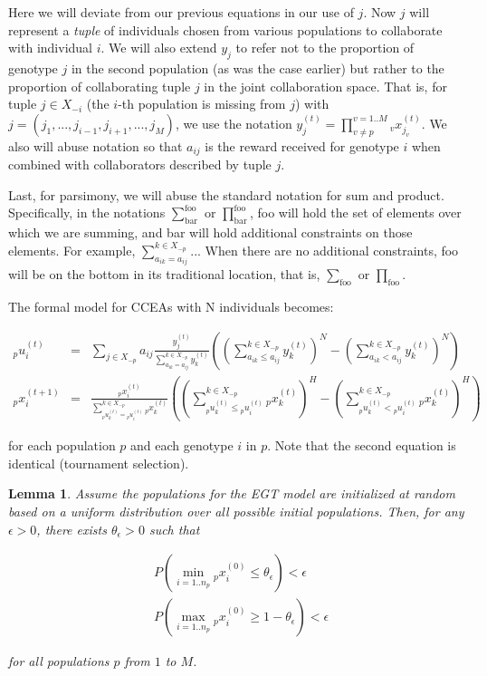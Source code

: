 \documentclass{acm_proc_article-sp}
\newtheorem{lemma}{Lemma}
\begin{document}
Here we will deviate from our previous equations in our use of \(j\).  Now \(j\) will represent a {\it tuple} of individuals chosen from various populations to collaborate with individual \(i\).  We will also extend \(y_j\) to refer not to the proportion of genotype \(j\) in the second population (as was the case earlier) but rather to the proportion of collaborating tuple \(j\) in the joint collaboration space.  That is, for tuple $j \in X_{-i}$ (the $i$-th population is missing from $j$) with $j = \left( j_1, ..., j_{i-1}, j_{i+1}, ..., j_M \right)$, we use the notation $y^{(t)}_j = \prod^{v=1..M}_{v \ne p} {_v}x^{(t)}_{j_v}$.  We also will abuse notation so that $a_{i j}$ is the reward received for genotype $i$ when combined with collaborators described by tuple $j$.

Last, for parsimony, we will abuse the standard notation for sum and product.  Specifically, in the notations \(\sum^{\mbox{foo}}_{\mbox{bar}}\) or \(\prod^{\mbox{foo}}_{\mbox{bar}}\),  foo will hold the set of elements over which we are summing, and bar will hold additional constraints on those elements.  For example, \(\sum^{k \in X_{-p}}_{a_{i k} = a_{i j}} ...\)  When there are no additional constraints, foo will be on the bottom in its traditional location, that is, \(\sum_{\mbox{foo}}\) or \(\prod_{\mbox{foo}}\).

The formal model for CCEAs with N individuals becomes:

\noindent\begin{eqnarray}
{_p}u^{(t)}_i & = & \sum_{j \in X_{-p}} { a_{i j} \frac{y^{(t)}_j}{\sum^{k \in X_{-p}}_{a_{i k} = a_{i j}} y^{(t)}_k} \left( \left( \sum^{k \in X_{-p}}_{a_{i k} \leq a_{i j} } y^{(t)}_k \right)^N - \left( \sum^{k \in X_{-p}}_{a_{i k} < a_{i j} } y^{(t)}_k \right)^N \right) } \label{approx_eqn1}\\
{_p}x^{(t+1)}_i   & = & \frac{{_p}x^{(t)}_i}{\sum^{k \in X_{-p}}_{{_p}u^{(t)}_k = {_p}u^{(t)}_i} {_p}x^{(t)}_k} \left( \left( \sum^{k \in X_{-p}}_{{_p}u^{(t)}_k \leq {_p}u^{(t)}_i} {_p}x^{(t)}_k \right)^H - \left( \sum^{k \in X_{-p}}_{{_p}u^{(t)}_k < {_p}u^{(t)}_i} {_p}x^{(t)}_k \right)^H \right) \label{approx_eqn2}
\end{eqnarray}

\noindent for each population $p$ and each genotype $i$ in $p$.  Note that the second equation is identical (tournament selection).

\begin{lemma}
Assume the populations for the EGT model are initialized at random based on a uniform distribution over all possible initial populations.  Then, for any $\epsilon>0$, there exists $\theta_\epsilon>0$ such that

\begin{eqnarray}
& P\left( \min_{i=1..n_p} {_p}x^{(0)}_i \leq \theta_\epsilon \right) < \epsilon \label{ineq1}\\
& P\left( \max_{i=1..n_p} {_p}x^{(0)}_i \geq 1-\theta_\epsilon \right) < \epsilon \label{ineq2}
\end{eqnarray}

for all populations $p$ from $1$ to $M$.
\end{lemma}
\end{document}
